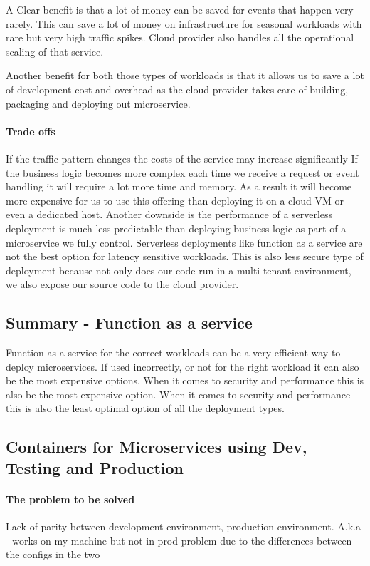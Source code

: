 A Clear benefit is that a lot of money can be saved for events that happen very rarely.
This can save a lot of money on infrastructure for seasonal workloads with rare but very high traffic spikes.
Cloud provider also handles all the operational scaling of that service.

Another benefit for both those types of workloads is that it allows us to save a lot of development cost and overhead as the cloud provider takes care of building, packaging and deploying out microservice.

\paragraph{Trade offs}
If the traffic pattern changes the costs of the service may increase significantly
If the business logic becomes more complex each time we receive a request or event handling it will require a lot more time and memory.
As a result it will become more expensive for us to use this offering than deploying it on a cloud VM or even a dedicated host.
Another downside is the performance of a serverless deployment is much less predictable than deploying business logic as part of a microservice we fully control.
Serverless deployments like function as a service are not the best option for latency sensitive workloads.
This is also less secure type of deployment because not only does our code run in a multi-tenant environment, we also expose our source code to the cloud provider.

\subsection{Summary - Function as a service}
Function as a service for the correct workloads can be a very efficient way to deploy microservices.
If used incorrectly, or not for the right workload it can also be the most expensive options.
When it comes to security and performance this is also be the most expensive option.
When it comes to security and performance this is also the least optimal option of all the deployment types.

\subsection{Containers for Microservices using Dev, Testing and Production}

\paragraph{The problem to be solved}
Lack of parity between development environment, production environment.
A.k.a - works on my machine but not in prod problem due to the differences between the configs in the two


